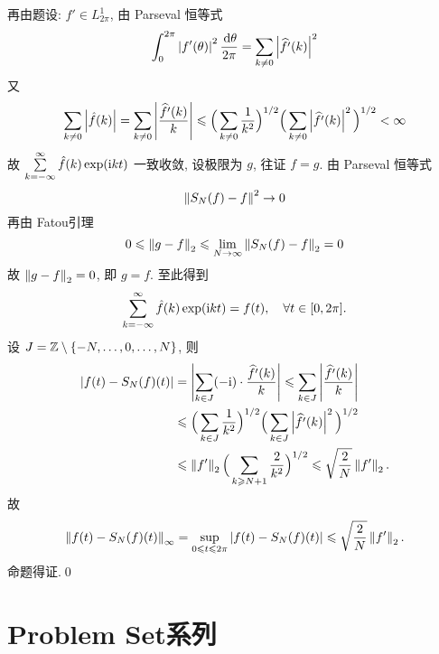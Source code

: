 \begin{Proof}
		再由题设: $ f'\in L_{2\pi}^{1} $, 由 Parseval 恒等式
		\[
			\int_{0}^{2\pi}\left| f'(\theta) \right| ^{2}\frac{\,\mathrm{d}\theta}{2\pi}=\sum_{k\ne0}\left| \widehat{f'}(k) \right| ^{2}
		\]
		又
		\[
			\sum_{k\ne0}\left| \hat{f}(k) \right| =\sum_{k\ne0}\left| \frac{\widehat{f'}(k)}{k} \right| \leqslant\Big( \sum_{k\ne0}\frac{1}{k^{2}} \Big)^{1/2}\Big( \sum_{k\ne0}\left| \widehat{f'}(k) \right| ^{2} \Big)^{1/2}<\infty
		\]
		故 $ \sum\limits_{k=-\infty}^{\infty}\hat{f}(k)\exp(\mathrm{i} kt) $ 一致收敛, 设极限为 $ g $, 往证 $ f=g $. 由 Parseval 恒等式
		\[
			\left\| S_{N}(f)-f \right\|^{2}\to 0
		\]
		再由 Fatou引理
		\[
			0\leqslant\left\| g-f \right\|_{2}\leqslant\lim_{N\to\infty}\left\| S_{N}(f)-f \right\|_{2}=0
		\]
		故 $ \left\| g-f \right\|_{2}=0 $, 即 $ g=f $. 至此得到
		\[
			\sum_{k=-\infty}^{\infty}\hat{f}(k)\exp(\mathrm{i} kt)=f(t), \quad \forall t\in[0, 2\pi].
		\]
		设 $ J=\mathbb{Z}\setminus\{ -N, \dots, 0, \dots, N \} $, 则
		\[
			\begin{aligned}
				\left| f(t)-S_{N}(f)(t) \right|  & =\left| \sum_{k\in J}(-\mathrm{i})\cdot\frac{\widehat{f'}(k)}{k} \right| \leqslant\sum_{k\in J}\left| \frac{\widehat{f'}(k)}{k} \right|  \\
				& \leqslant\Big( \sum_{k\in J}\frac{1}{k^{2}} \Big)^{1/2}\Big( \sum_{k\in J}\left| \widehat{f'}(k) \right| ^{2} \Big)^{1/2}\\
				& \leqslant \left\| f' \right\|_{2}\Big( \sum_{k\geqslant N+1}\frac{2}{k^{2}} \Big)^{1/2}\leqslant\sqrt{\frac{2}{N}}\left\| f' \right\|_{2}.
			\end{aligned}
		\]
		故
		\[
			\left\| f(t)-S_{N}(f)(t) \right\|_{\infty}=\sup_{0\leqslant t\leqslant2\pi}\left| f(t)-S_{N}(f)(t) \right| \leqslant\sqrt{\frac{2}{N}}\left\| f' \right\|_{2}.
		\]
		命题得证.\qed
	\end{Proof}

	\section{Problem Set系列}

